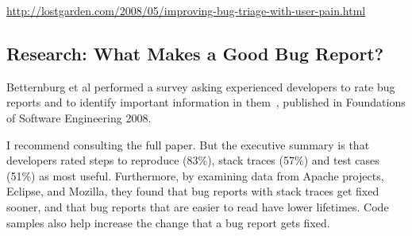 \documentclass[11pt]{article}
\begin{document}
\begin{center}
\url{http://lostgarden.com/2008/05/improving-bug-triage-with-user-pain.html}
\end{center}

\subsection*{Research: What Makes a Good Bug Report?}
Betternburg et al performed a survey asking experienced developers to
rate bug reports and to identify important information in
them~\cite{bettenburg-fse-2008}, published in Foundations of Software
Engineering 2008.

I recommend consulting the full paper. But the executive summary is
that developers rated steps to reproduce (83\%), stack traces (57\%)
and test cases (51\%) as most useful. Furthermore, by examining data
from Apache projects, Eclipse, and Mozilla, they found that bug
reports with stack traces get fixed sooner, and that bug reports that
are easier to read have lower lifetimes. Code samples also help increase
the change that a bug report gets fixed.



\nocite{kaner:_bug_advoc}


\end{document}
